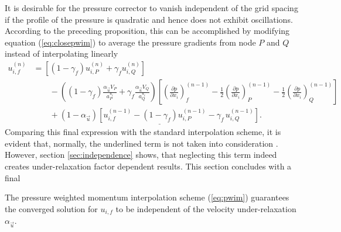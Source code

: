 It is desirable for the pressure corrector to vanish independent of the grid spacing if the profile of the pressure is quadratic and hence does not exhibit oscillations. According to the preceding proposition, this can be accomplished by modifying equation (\ref{eq:closepwim}) to average the pressure gradients from node \(P\) and \(Q\) instead of interpolating linearly
\begin{align}
  u_{i,f}^{(n)} 
  &=
  \left[\left(1 - \gamma_f\right) u_{i,P}^{(n)} + \gamma_f u_{i,Q}^{(n)} \right] \nonumber\\[1em]
  &\quad\quad - 
  \left(\left(1 - \gamma_f\right) \frac{\alpha_\vec{u} V_P}{a_P^{u_i}} + \gamma_f \frac{\alpha_\vec{u} V_Q}{a_Q^{u_i}}\right)
  \left[ 
  \left(\frac{\partial p}{\partial x_i}\right)_f^{(n-1)} 
  - \frac{1}{2} \left( \frac{\partial p}{\partial x_i} \right)_P^{(n-1)} 
  - \frac{1}{2} \left(\frac{\partial p}{\partial x_i}\right)_Q^{(n-1)}
  \right] \nonumber \\[1em]
  \label{eq:pwim}
  &\quad\quad + \underline{\left(1 - \alpha_\vec{u}\right) \left[ u_{i,f}^{(n-1)} - \left(1 - \gamma_f\right) u_{i,P}^{(n-1)} - \gamma_f \, u_{i,Q}^{(n-1)} \right]}.
\end{align}
Comparing this final expression with the standard interpolation scheme, it is evident that, normally, the underlined term is not taken into consideration \cite{ferziger02}. However, section \ref{sec:independence} shows, that neglecting this term indeed creates under-relaxation factor dependent results. This section concludes with a final
\begin{prop}
  The pressure weighted momentum interpolation scheme (\ref{eq:pwim}) guarantees the converged solution for \(u_{i,f}\) to be independent of the velocity under-relaxation \(\alpha_\vec{u}\).
\end{prop}
